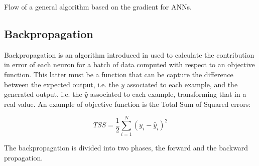 \begin{algorithm}
	\begin{algorithmic}[1]
		\Repeat
				\EndFor
			\EndFor
	\end{algorithmic}
	\caption{Flow of a general algorithm based on the gradient for ANNs.}\label{alg:ann-training}
\end{algorithm}

\subsection{Backpropagation}\label{subsec:backpropagation}
Backpropagation is an algorithm introduced in \cite{RUM:1986} used to calculate the contribution in error of each neuron for a batch of data computed with respect to an objective function. This latter must be a function that can be capture the difference between the expected output, i.e. the $y$ associated to each example, and the generated output, i.e. the $\hat{y}$ associated to each example, transforming that in a real value.
An example of objective function is the Total Sum of Squared errors:
\begin{center}
	\begin{equation}
		TSS = \frac{1}{2}\sum\limits_{i=1}^{N}(y_i - \hat{y}_{i})^{2}
	\end{equation}\label{eq:tss}
\end{center}
The backpropagation is divided into two phases, the forward and the backward propagation.

